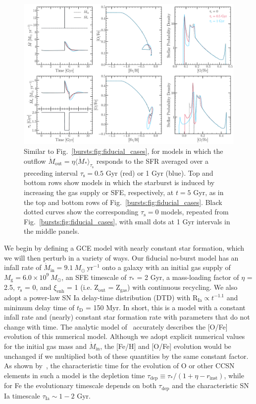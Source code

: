 \begin{figure} %
\includegraphics[scale = 0.31]{smoothing_time.pdf}
\caption{
Similar to Fig.~\ref{bursts:fig:fiducial_cases}, for models in which the outflow 
$\dot{M}_\text{out} = \eta\langle\dot{M}_*\rangle_{\tau_\text{s}}$ responds 
to the SFR averaged over a preceding interval $\tau_\text{s} = 0.5$ Gyr (red) 
or 1 Gyr (blue). Top and bottom rows show models in which the starburst is 
induced by increasing the gas supply or SFE, respectively, at $t = 5$ Gyr, as 
in the top and bottom rows of Fig.~\ref{bursts:fig:fiducial_cases}. Black dotted 
curves show the corresponding $\tau_\text{s} = 0$ models, repeated from 
Fig.~\ref{bursts:fig:fiducial_cases}, with small dots at 1 Gyr intervals in the 
middle panels.  
}
\label{bursts:fig:ts_combined}
\end{figure} 

We begin by defining a GCE model with nearly constant star formation, which we 
will then perturb in a variety of ways. Our fiducial no-burst model has an 
infall rate of $\dot{M}_\text{in} = 9.1\ M_\odot\ \text{yr}^{-1}$ onto a galaxy 
with an initial gas supply of $M_\text{g} = 6.0\times10^9\ M_\odot$, an SFE 
timescale of $\tau_*$ = 2 Gyr, a mass-loading factor of $\eta$ = 2.5, 
$\tau_\text{s}$ = 0, and $\xi_\text{enh}$ = 1 (i.e. Z$_\text{out}$ = 
Z$_\text{gas}$) with continuous recycling. We also adopt a power-law SN Ia 
delay-time distribution (DTD) with R$_\text{Ia} \propto t^{-1.1}$ and minimum 
delay time of $t_\text{D}$ = 150 Myr. In short, this is a model with a 
constant infall rate and (nearly) constant star formation rate with parameters 
that do not change with time. The analytic model of~\citet{Weinberg2017b} 
accurately describes the [O/Fe] evolution of this numerical model. Although we 
adopt explicit numerical values for the initial gas mass and 
$\dot{M}_\text{in}$, the [Fe/H] and [O/Fe] evolution would be unchanged if we 
multiplied both of these quantities by the same constant factor. As shown 
by~\citet{Weinberg2017b}, the characteristic time for the evolution of O 
or other CCSN elements in such a model is the depletion time 
$\tau_\text{dep} \equiv \tau_*/(1 + \eta - r_\text{inst})$, while for Fe the 
evolutionary timescale depends on both $\tau_\text{dep}$ and the characteristic 
SN Ia timescale $\tau_\text{Ia}\sim 1-2$ Gyr. 


